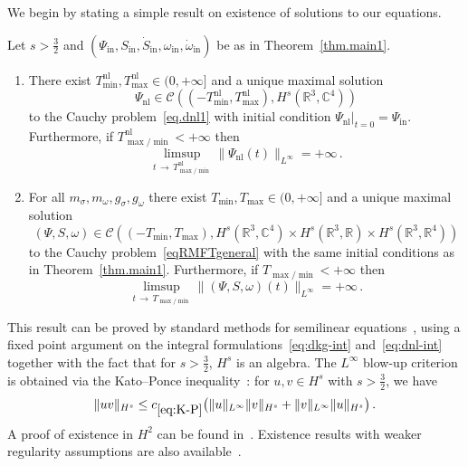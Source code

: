 \documentclass[AHL,Unicode,longabstracts,published]{cedram}
\newcommand{\rmin}{\mathrm{in}}
\newcommand{\nl}{\mathrm{nl}}
\newcommand{\cC}{\mathcal{C}}
\newcommand\R{\mathbb{R}}
\newcommand\C{\mathbb{C}}
\newcommand\ii{{\ensuremath {\infty}}}
\newcommand*{\romanenumi}{\renewcommand*{\theenumi}{\roman{enumi}}}
\begin{document}
We begin by stating a simple result on existence of solutions to our equations.

\begin{prop}\label{prop:exist}
Let $s>\tfrac32$ and $(\Psi_\rmin, S_\rmin, \dot S_\rmin, \omega_\rmin, \dot \omega_\rmin)$ be as in Theorem~\ref{thm.main1}.
\begin{enumerate}\romanenumi
\item\label{pt1.prop}
There exist $T_{\min}^{\nl}, T_{\max}^{\nl}\in(0,+\infty]$ and a unique maximal solution
\[
\Psi_{\nl}\in\cC\left(\left(-T_{\min}^{\nl}, T_{\max}^{\nl}\right),H^s\left(\R^3, \C^4\right)\right)
\]
to the Cauchy problem~\eqref{eq.dnl1} with initial condition $\Psi_{\nl}\vert_{t=0}=\Psi_{\rmin}$. Furthermore, if $T_{\max/\min}^{\nl}<+\infty$ then
\[
\limsup_{t\,\to\,T_{\max/\min}^{\nl}}\|\Psi_{\nl}(t)\|_{L^\infty}= +\infty\,.
\]
\item\label{pt2.prop}
For all $m_\sigma, m_\omega, g_\sigma, g_\omega$ there exist $T_{\min}, T_{\max}\in(0,+\infty]$ and a unique maximal solution
\[
(\Psi,S,\omega)\in \cC\left(\left(-T_{\min}, T_{\max}\right),H^s\left(\R^3, \C^4\right)\times H^s\left(\R^3,\R\right)\times H^s\left(\R^3, \R^4\right)\right)
\]
to the Cauchy problem~\eqref{eqRMFTgeneral} with the same initial conditions as in Theorem~\ref{thm.main1}. Furthermore, if $T_{\max/\min}<+\infty$ then
\begin{equation}\label{eq:blowup-crit}
\limsup_{t\,\to\,T_{\max/\min}}\|(\Psi,S,\omega)(t)\|_{L^\infty} = +\infty\,.
\end{equation}
\end{enumerate}
\end{prop}

This result can be proved by standard methods for semilinear equations~\cite{cazenave2003}, using a fixed point argument on the integral formulations~\eqref{eq:dkg-int} and~\eqref{eq:dnl-int} together with the fact that for $s>\tfrac32$, $H^s$ is an algebra. The $L^\ii$ blow-up criterion is obtained via the Kato--Ponce inequality~\cite[Lemma~X.4]{KatPon-88}: for $u,v\in H^{s}$ with $s>\tfrac32$, we have
\begin{equation}\label{eq:K-P}
\|uv\|_{H^s}\leq c_{\eqref{eq:K-P}}\big(\|u\|_{L^\infty}\|v\|_{H^s} + \|v\|_{L^\infty}\|u\|_{H^s}\big)\,.
\end{equation}
A proof of existence in $H^2$ can be found in~\cite{najman1992}. Existence results with weaker regularity assumptions are also available~\cite{bejenaru2015, bejenaru2017, candy2018,escobedo1997,machihara2003, machihara2005}.
\end{document}

